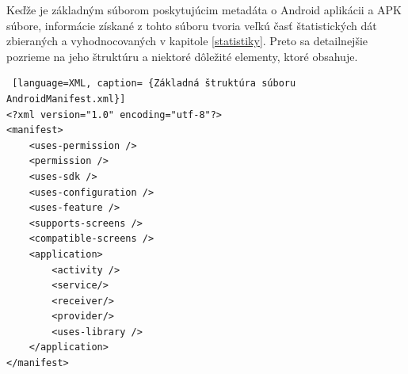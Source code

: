 Keďže  je základným súborom poskytujúcim metadáta o Android aplikácii a APK súbore, informácie získané z tohto súboru tvoria veľkú časť štatistických dát zbieraných a vyhodnocovaných v kapitole \ref{statistiky}. Preto sa detailnejšie pozrieme na jeho štruktúru a niektoré dôležité elementy, ktoré obsahuje.
\begin{lstlisting} [language=XML, caption= {Základná štruktúra súboru AndroidManifest.xml}]
<?xml version="1.0" encoding="utf-8"?>
<manifest>
    <uses-permission />
    <permission />
    <uses-sdk />
    <uses-configuration />  
    <uses-feature />  
    <supports-screens />  
    <compatible-screens />  
    <application>
        <activity />
        <service/>
        <receiver/>
        <provider/>
        <uses-library />
    </application>
</manifest>
\end{lstlisting}


